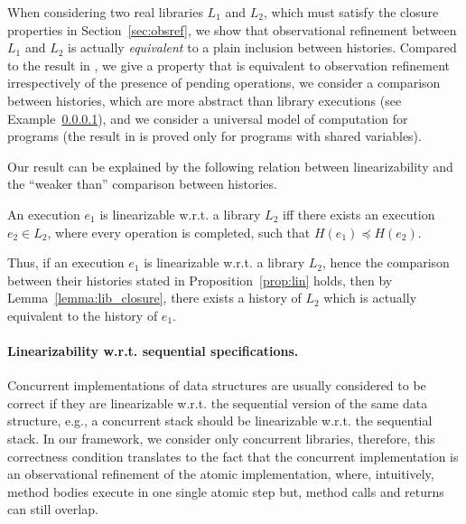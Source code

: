 When considering two real libraries $L_1$ and $L_2$, which must satisfy the
closure properties in Section~\ref{sec:obsref}, we show that observational
refinement between $L_1$ and $L_2$ is actually \emph{equivalent} to a plain
inclusion between histories. Compared to the result in
\citet{journals/tcs/FilipovicORY10}, we give a property that is equivalent to
observation refinement irrespectively of the presence of pending operations, we
consider a comparison between histories, which are more abstract than library
executions (see Example~\ref{}), and we consider a universal model of
computation for programs (the result in \citet{journals/tcs/FilipovicORY10} is
proved only for programs with shared variables).

Our result can be explained by the following relation between linearizability
and the ``weaker than'' comparison between histories.

\begin{proposition}
  \label{prop:lin}

  An execution $e_1$ is linearizable w.r.t. a library $L_2$ iff there exists an
  execution $e_2\in L_2$, where every operation is completed, such that
  $H(e_1)\preceq H(e_2)$.

\end{proposition}


Thus, if an execution $e_1$ is linearizable w.r.t. a library $L_2$, hence the
comparison between their histories stated in Proposition~\ref{prop:lin} holds,
then by Lemma~\ref{lemma:lib_closure}, there exists a history of $L_2$ which is
actually equivalent to the history of $e_1$.

\paragraph{Linearizability w.r.t. sequential specifications.}

Concurrent implementations of data structures are usually considered to be
correct if they are linearizable w.r.t. the sequential version of the same data
structure, e.g., a concurrent stack should be linearizable w.r.t. the
sequential stack. In our framework, we consider only concurrent libraries,
therefore, this correctness condition translates to the fact that the
concurrent implementation is an observational refinement of the atomic
implementation, where, intuitively, method bodies execute in one single atomic
step but, method calls and returns can still overlap.

